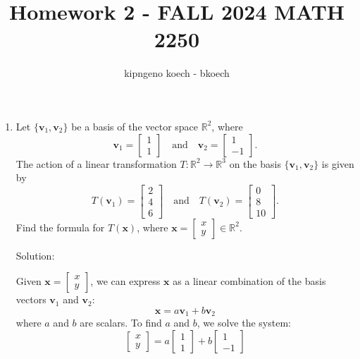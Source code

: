 \documentclass{article}
\begin{document}
\author{kipngeno koech - bkoech}
\title{Homework 2 - FALL 2024 MATH 2250}
\maketitle

\medskip

\begin{enumerate}

\item Let \(\{\mathbf{v}_1, \mathbf{v}_2\}\) be a basis of the vector space \(\mathbb{R}^2\), where
\[
\mathbf{v}_1 = \begin{bmatrix} 1 \\ 1 \end{bmatrix} \quad \text{and} \quad \mathbf{v}_2 = \begin{bmatrix} 1 \\ -1 \end{bmatrix}.
\]
The action of a linear transformation \(T : \mathbb{R}^2 \to \mathbb{R}^3\) on the basis \(\{\mathbf{v}_1, \mathbf{v}_2\}\) is given by
\[
T(\mathbf{v}_1) = \begin{bmatrix} 2 \\ 4 \\ 6 \end{bmatrix} \quad \text{and} \quad T(\mathbf{v}_2) = \begin{bmatrix} 0 \\ 8 \\ 10 \end{bmatrix}.
\]
Find the formula for \(T(\mathbf{x})\), where \(\mathbf{x} = \begin{bmatrix} x \\ y \end{bmatrix} \in \mathbb{R}^2\).

Solution:

Given \(\mathbf{x} = \begin{bmatrix} x \\ y \end{bmatrix}\), we can express \(\mathbf{x}\) as a linear combination of the basis vectors \(\mathbf{v}_1\) and \(\mathbf{v}_2\):
\[
\mathbf{x} = a \mathbf{v}_1 + b \mathbf{v}_2
\]
where \(a\) and \(b\) are scalars. To find \(a\) and \(b\), we solve the system:
\[
\begin{bmatrix} x \\ y \end{bmatrix} = a \begin{bmatrix} 1 \\ 1 \end{bmatrix} + b \begin{bmatrix} 1 \\ -1 \end{bmatrix}
\]


\end{enumerate}
\end{document}
